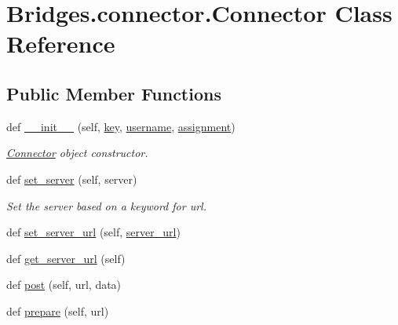 \hypertarget{class_bridges_1_1connector_1_1_connector}{}\section{Bridges.\+connector.\+Connector Class Reference}
\label{class_bridges_1_1connector_1_1_connector}
\subsection*{Public Member Functions}
\begin{DoxyCompactItemize}
\item 
def \hyperlink{class_bridges_1_1connector_1_1_connector_aadfd9186c6d989ae7981270560d9ee36}{\+\_\+\+\_\+init\+\_\+\+\_\+} (self, \hyperlink{class_bridges_1_1connector_1_1_connector_abea85b824f7ab9c52c70c9d6bcf4fa74}{key}, \hyperlink{class_bridges_1_1connector_1_1_connector_aeab093f0dd4b59e46ab280bf7af5ffb8}{username}, \hyperlink{class_bridges_1_1connector_1_1_connector_a1f6453ca6554da7ea99be8e55b51b4bf}{assignment})
\begin{DoxyCompactList}\small\item\em \hyperlink{class_bridges_1_1connector_1_1_connector}{Connector} object constructor. \end{DoxyCompactList}\item 
def \hyperlink{class_bridges_1_1connector_1_1_connector_abf1fd0ecfb8b34a9093fcb3fd66e4383}{set\+\_\+server} (self, server)
\begin{DoxyCompactList}\small\item\em Set the server based on a keyword for url. \end{DoxyCompactList}\item 
def \hyperlink{class_bridges_1_1connector_1_1_connector_a4d94a6661535eabc0d29b9c5fd8c53ea}{set\+\_\+server\+\_\+url} (self, \hyperlink{class_bridges_1_1connector_1_1_connector_a8795d2c7dca04e053f89ded81fe1a119}{server\+\_\+url})
\item 
def \hyperlink{class_bridges_1_1connector_1_1_connector_afc3ab8dc9ec3e7bfc22b036ec9a14c54}{get\+\_\+server\+\_\+url} (self)
\item 
def \hyperlink{class_bridges_1_1connector_1_1_connector_ab0e2e57569bf48efc114cd961a1c6613}{post} (self, url, data)
\item 
def \hyperlink{class_bridges_1_1connector_1_1_connector_acc031e5649eb14e152bac2cb9c2a744d}{prepare} (self, url)
\end{DoxyCompactItemize}
